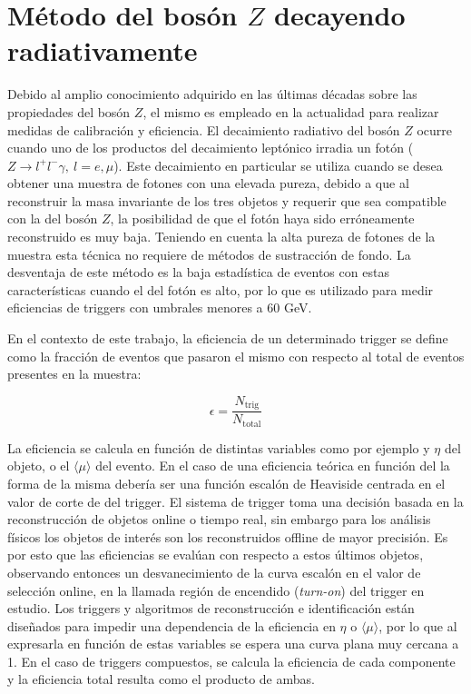 \section{Método del bosón $Z$ decayendo radiativamente}

Debido al amplio conocimiento adquirido en las últimas décadas sobre las propiedades del bosón $Z$, el mismo es empleado en la actualidad para realizar medidas de calibración y eficiencia. El decaimiento radiativo del bosón $Z$ ocurre cuando uno de los productos del decaimiento leptónico irradia un fotón ($Z\to l^{+}l^{-}\gamma,\:l=e,\mu$). Este decaimiento en particular se utiliza cuando se desea obtener una muestra de fotones con una elevada pureza, debido a que al reconstruir la masa invariante de los tres objetos y requerir que sea compatible con la del bosón $Z$, la posibilidad de que el fotón haya sido erróneamente reconstruido es muy baja. Teniendo en cuenta la alta pureza de fotones de la muestra esta técnica no requiere de métodos de sustracción de fondo. La desventaja de este método es la baja estadística de eventos con estas características cuando el \pt del fotón es alto, por lo que es utilizado para medir eficiencias de triggers con umbrales menores a 60 GeV.

En el contexto de este trabajo, la eficiencia de un determinado trigger se define como la fracción de eventos que pasaron el mismo con respecto al total de eventos presentes en la muestra:

\begin{equation}
	\epsilon = \frac{N_\text{trig}}{N_\text{total}}
	\label{eq:trig_eff}
\end{equation}

La eficiencia se calcula en función de distintas variables como por ejemplo \ET y $\eta$ del objeto, o el $\langle\mu\rangle$ del evento. En el caso de una eficiencia teórica en función del \ET la forma de la misma debería ser una función escalón de Heaviside centrada en el valor de corte de \ET del trigger. El sistema de trigger toma una decisión basada en la reconstrucción de objetos online o tiempo real, sin embargo para los análisis físicos los objetos de interés son los reconstruidos offline de mayor precisión. Es por esto que las eficiencias se evalúan con respecto a estos últimos objetos, observando entonces un desvanecimiento de la curva escalón en el valor de selección online, en la llamada región de encendido (\textit{turn-on}) del trigger en estudio. 
Los triggers y algoritmos de reconstrucción e identificación están diseñados para impedir una dependencia de la eficiencia en $\eta$ o $\langle\mu\rangle$, por lo que al expresarla en función de estas variables se espera una curva plana muy cercana a 1. En el caso de triggers compuestos, se calcula la eficiencia de cada componente y la eficiencia total resulta como el producto de ambas.


